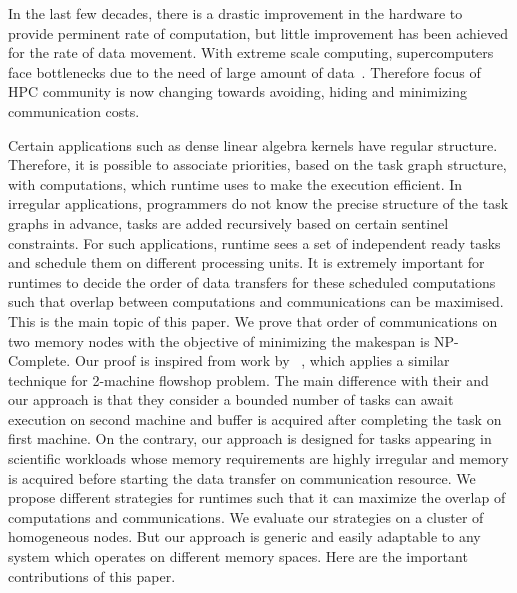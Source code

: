 \documentclass[sigconf]{acmart}
\begin{document}
	
	
	
	In the last few decades, there is a drastic improvement in the hardware to provide perminent rate of computation, but little improvement has been achieved for the rate of data movement. With extreme scale computing, supercomputers face bottlenecks due to the need of large amount of data~\cite{ascaccommitteereport2014,yelick2016}. Therefore focus of HPC community is now changing towards avoiding, hiding and minimizing communication costs.
	
	
	Certain applications such as dense linear algebra kernels have regular structure. Therefore, it is possible to associate priorities, based on the task graph structure, with computations, which runtime uses to make the execution efficient. In irregular applications, programmers do not know the precise structure of the task graphs in advance, tasks are added recursively based on certain sentinel constraints. For such applications, runtime sees a set of independent ready tasks and schedule them on different processing units. It is extremely important for runtimes to decide the order of data transfers for these scheduled computations such that overlap between computations and communications can be maximised. This is the main topic of this paper. We prove that order of communications on two memory nodes with the objective of minimizing the makespan is NP-Complete. Our proof is inspired from work by ~\cite{Papadimitriou:1980:FSL:322203.322213}, which applies a similar technique for 2-machine flowshop problem. The main difference with their and our approach is that they consider a bounded number of tasks can await execution on second machine and buffer is acquired after completing the task on first machine. On the contrary, our approach is designed for tasks appearing in scientific workloads whose memory requirements are highly irregular and memory is acquired before starting the data transfer on communication resource. We propose different strategies for runtimes such that it can maximize the overlap of computations and communications. We evaluate our strategies on a cluster of homogeneous nodes. But our approach is generic and easily adaptable to any system which operates on different memory spaces. Here are the important contributions of this paper.
	
\end{document}
